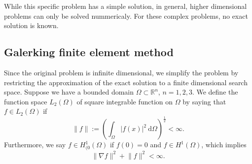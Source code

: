 \documentclass[a4paper]{article}
\newcommand{\dd}{\mathrm{d}}
\newcommand{\Reals}{\mathbb{R}}
\newcommand{\LO}{\ensuremath{L_2(\Omega)}}
\newcommand{\HO}{\ensuremath{H^1(\Omega)}}
\newcommand{\HOzero}{\ensuremath{H^1_{(0}(\Omega)}}
\begin{document}
While this specific problem has a simple solution, in general, higher
dimensional problems can only be solved nummericaly. For these complex
problems, no exact solution is known.

\subsection{Galerking finite element method}

Since the original problem is infinite dimensional, we simplify the
problem by restricting the approximation of the exact solution to a
finite dimensional search space. Suppose we have a bounded domain
$\Omega \subset \Reals^n$, $n = 1, 2, 3$.  We define the function
space $\LO$ of square integrable function on $\Omega$ by saying that
$f \in \LO$ if
\begin{equation}
  \lVert f \rVert := \left(
    \int_\Omega | f(x) |^2 \ \dd\Omega \right)^{\frac{1}{2}} < \infty.
\end{equation}
Furthermore, we say $f \in \HOzero$ if $f(0) = 0$ and $f \in \HO$,
which implies
\begin{equation}
  \lVert \nabla f \rVert^2 + \lVert f \rVert^2 < \infty.
\end{equation}
\end{document}

